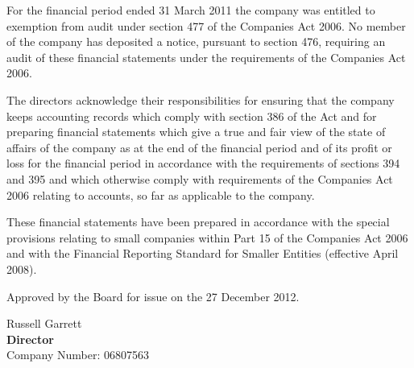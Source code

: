 {\footnotesize For the financial period ended 31 March 2011 the
company was entitled to exemption from audit under section 477 of the
Companies Act 2006. No member of the company has deposited a
notice, pursuant to section 476, requiring an audit of these
financial statements under the requirements of the Companies Act
2006.

The directors acknowledge their responsibilities for ensuring that
the company keeps accounting records which comply with section 386
of the Act and for preparing financial statements which give a true
and fair view of the state of affairs of the company as at the end
of the financial period and of its profit or loss for the financial
period in accordance with the requirements of sections 394 and 395
and which otherwise comply with requirements of the Companies Act
2006 relating to accounts, so far as applicable to the company.

These financial statements have been prepared in accordance with
the special provisions relating to small companies within Part 15
of the Companies Act 2006 and with the Financial Reporting Standard
for Smaller Entities (effective April 2008).}

\vfill

Approved by the Board for issue on the 27 December 2012.
\vspace{48pt}

Russell Garrett \\
{\bf Director} \\
Company Number: 06807563
